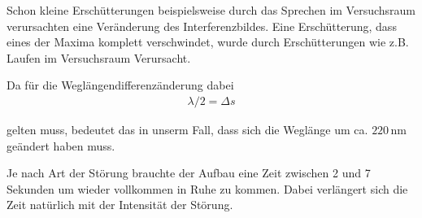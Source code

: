 
Schon kleine Erschütterungen beispielsweise durch das Sprechen im Versuchsraum verursachten eine Veränderung des Interferenzbildes. Eine Erschütterung, dass eines der Maxima komplett verschwindet, wurde durch Erschütterungen wie z.B. Laufen im Versuchsraum Verursacht.

Da für die Weglängendifferenzänderung dabei
\begin{align}
  \lambda / 2 = \Delta s
\end{align}

gelten muss, bedeutet das in unserm Fall, dass sich die Weglänge um ca. $220\, \text{nm}$ geändert haben muss.

Je nach Art der Störung brauchte der Aufbau eine Zeit zwischen 2 und 7 Sekunden um wieder vollkommen in Ruhe zu kommen. Dabei verlängert sich die Zeit natürlich mit der Intensität der Störung.
